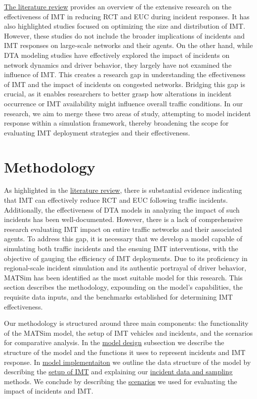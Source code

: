 \documentclass[fancy, oneside, mastersfancy, ms]{byuthesis}
\begin{document}
\protect\hyperlink{sec-literature}{The literature review} provides an
overview of the extensive research on the effectiveness of IMT in
reducing RCT and EUC during incident responses. It has also highlighted
studies focused on optimizing the size and distribution of IMT. However,
these studies do not include the broader implications of incidents and
IMT responses on large-scale networks and their agents. On the other
hand, while DTA modeling studies have effectively explored the impact of
incidents on network dynamics and driver behavior, they largely have not
examined the influence of IMT. This creates a research gap in
understanding the effectiveness of IMT and the impact of incidents on
congested networks. Bridging this gap is crucial, as it enables
researchers to better grasp how alterations in incident occurrence or
IMT availability might influence overall traffic conditions. In our
research, we aim to merge these two areas of study, attempting to model
incident response within a simulation framework, thereby broadening the
scope for evaluating IMT deployment strategies and their effectiveness.


\hypertarget{sec-methods}{%
\chapter{Methodology}\label{sec-methods}}

As highlighted in the \protect\hyperlink{sec-literature}{literature
review}, there is substantial evidence indicating that IMT can
effectively reduce RCT and EUC following traffic incidents.
Additionally, the effectiveness of DTA models in analyzing the impact of
such incidents has been well-documented. However, there is a lack of
comprehensive research evaluating IMT impact on entire traffic networks
and their associated agents. To address this gap, it is necessary that
we develop a model capable of simulating both traffic incidents and the
ensuing IMT interventions, with the objective of gauging the efficiency
of IMT deployments. Due to its proficiency in regional-scale incident
simulation and its authentic portrayal of driver behavior, MATSim has
been identified as the most suitable model for this research. This
section describes the methodology, expounding on the model's
capabilities, the requisite data inputs, and the benchmarks established
for determining IMT effectiveness.

Our methodology is structured around three main components: the
functionality of the MATSim model, the setup of IMT vehicles and
incidents, and the scenarios for comparative analysis. In the
\protect\hyperlink{sec-MATSim_mod}{model design} subsection we describe
the structure of the model and the functions it uses to represent
incidents and IMT response. In \protect\hyperlink{sec-model_imp}{model
implementaiton} we outline the data structure of the model by describing
the \protect\hyperlink{sec-IMT_setup}{setup of IMT} and explaining our
\protect\hyperlink{sec-inc_data}{incident data and sampling} methods. We
conclude by describing the \protect\hyperlink{sec-scenarios}{scenarios}
we used for evaluating the impact of incidents and IMT.
\end{document}
